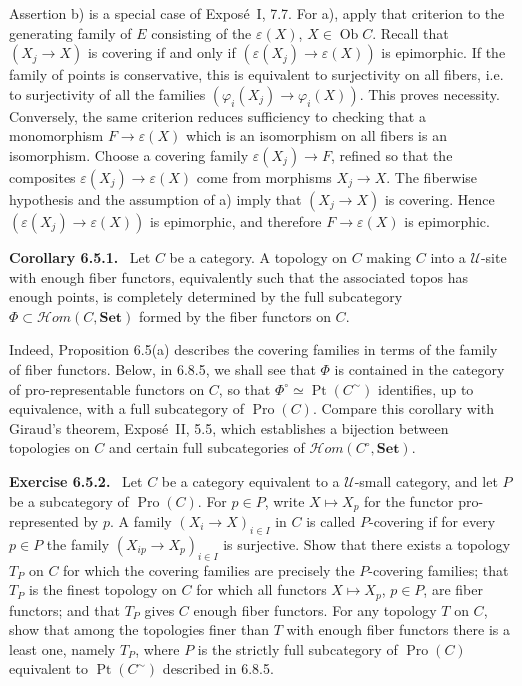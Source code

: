 \documentclass[11pt]{article}
\newcommand{\U}{\mathcal{U}}
\newcommand{\Set}{\mathbf{Set}}
\newcommand{\Ppoint}{\operatorname{Pt}}
\newcommand{\Hhom}{\mathcal{H}om}
\newenvironment{statement}[1]{\par\medskip\noindent\textbf{#1.}\ }{\par\medskip}
\newenvironment{remarktext}[1]{\par\medskip\noindent\textbf{#1.}\ }{\par\medskip}
\begin{document}
Assertion b) is a special case of Expos\'e~I, 7.7. For a), apply that criterion to the generating family of \(E\) consisting of the \(\varepsilon(X)\), \(X\in\operatorname{Ob}C\). Recall that \((X_j\to X)\) is covering if and only if \((\varepsilon(X_j)\to\varepsilon(X))\) is epimorphic. If the family of points is conservative, this is equivalent to surjectivity on all fibers, i.e. to surjectivity of all the families \((\varphi_i(X_j)\to\varphi_i(X))\). This proves necessity. Conversely, the same criterion reduces sufficiency to checking that a monomorphism \(F\to\varepsilon(X)\) which is an isomorphism on all fibers is an isomorphism. Choose a covering family \(\varepsilon(X_j)\to F\), refined so that the composites \(\varepsilon(X_j)\to\varepsilon(X)\) come from morphisms \(X_j\to X\). The fiberwise hypothesis and the assumption of a) imply that \((X_j\to X)\) is covering. Hence \((\varepsilon(X_j)\to\varepsilon(X))\) is epimorphic, and therefore \(F\to\varepsilon(X)\) is epimorphic.

\begin{statement}{Corollary 6.5.1}
Let \(C\) be a category. A topology on \(C\) making \(C\) into a \(\U\)-site with enough fiber functors, equivalently such that the associated topos has enough points, is completely determined by the full subcategory \(\Phi\subset\Hhom(C,\Set)\) formed by the fiber functors on \(C\).
\end{statement}

Indeed, Proposition 6.5(a) describes the covering families in terms of the family of fiber functors. Below, in 6.8.5, we shall see that \(\Phi\) is contained in the category of pro-representable functors on \(C\), so that \(\Phi^\circ\simeq\Ppoint(C^{\sim})\) identifies, up to equivalence, with a full subcategory of \(\operatorname{Pro}(C)\). Compare this corollary with Giraud's theorem, Expos\'e~II, 5.5, which establishes a bijection between topologies on \(C\) and certain full subcategories of \(\Hhom(C^\circ,\Set)\).

\begin{remarktext}{Exercise 6.5.2}
Let \(C\) be a category equivalent to a \(\U\)-small category, and let \(P\) be a subcategory of \(\operatorname{Pro}(C)\). For \(p\in P\), write \(X\mapsto X_p\) for the functor pro-represented by \(p\). A family \((X_i\to X)_{i\in I}\) in \(C\) is called \(P\)-covering if for every \(p\in P\) the family \((X_{ip}\to X_p)_{i\in I}\) is surjective. Show that there exists a topology \(T_P\) on \(C\) for which the covering families are precisely the \(P\)-covering families; that \(T_P\) is the finest topology on \(C\) for which all functors \(X\mapsto X_p\), \(p\in P\), are fiber functors; and that \(T_P\) gives \(C\) enough fiber functors. For any topology \(T\) on \(C\), show that among the topologies finer than \(T\) with enough fiber functors there is a least one, namely \(T_P\), where \(P\) is the strictly full subcategory of \(\operatorname{Pro}(C)\) equivalent to \(\Ppoint(C^{\sim})\) described in 6.8.5.
\end{remarktext}
\end{document}

